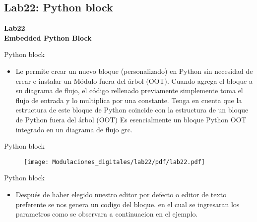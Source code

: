 \subsection{Lab22: Python block}

\begin{frame}{}


\bfseries{\textrm{\LARGE Lab22\\ \Large Embedded Python Block}}
\raggedright
\end{frame}


\begin{frame}{Python block }



  \begin{itemize}
  \item \justifying Le permite crear un nuevo bloque (personalizado) en Python sin necesidad de crear e instalar un Módulo fuera del árbol (OOT). Cuando agrega el bloque a su diagrama de flujo, el código rellenado previamente simplemente toma el flujo de entrada y lo multiplica por una constante. Tenga en cuenta que la estructura de este bloque de Python coincide con la estructura de un bloque de Python fuera del árbol (OOT) Es esencialmente un bloque Python OOT integrado en un diagrama de flujo grc.


 
  \end{itemize}
\end{frame}

\begin{frame}{Python block}

\begin{figure}[H]
\centering
\texttt{[image: Modulaciones\_digitales/lab22/pdf/lab22.pdf]}
\end{figure}
\end{frame}


\begin{frame}{Python block }



  \begin{itemize}
  \item \justifying Después de haber elegido nuestro editor por defecto o editor de texto preferente se nos genera un codigo del bloque. en el cual se ingresaran los parametros como se observara a continuacion en el ejemplo.

  \end{itemize}
\end{frame}

